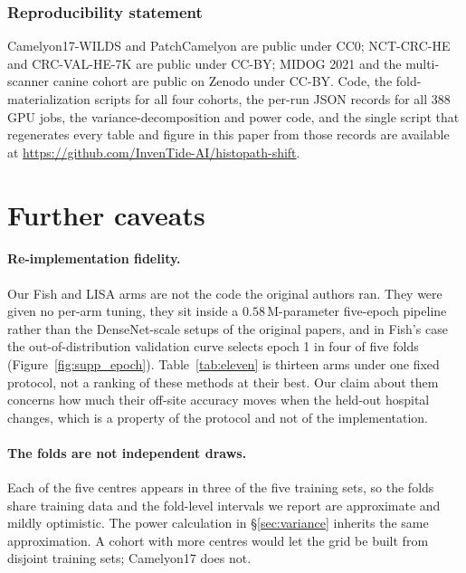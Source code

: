 \documentclass[10pt]{article} %
\begin{document}
\subsubsection*{Reproducibility statement}

Camelyon17-WILDS \citep{koh2021wilds} and PatchCamelyon \citep{veeling2018pcam}
are public under CC0; NCT-CRC-HE and CRC-VAL-HE-7K
\citep{kather2018nct,kather2019predicting} are public under CC-BY; MIDOG 2021
\citep{aubreville2023midog} and the multi-scanner canine cohort
\citep{wilm2023canine} are public on Zenodo under CC-BY. Code, the
fold-materialization scripts for all four cohorts, the per-run JSON records for
all 388 GPU jobs, the variance-decomposition and power code, and the single
script that regenerates every table and figure in this paper from those records
are available at
\url{https://github.com/InvenTide-AI/histopath-shift}.




\appendix
\section{Further caveats}
\label{app:caveats}

\paragraph{Re-implementation fidelity.} Our Fish and LISA arms are not the code
the original authors ran. They were given no per-arm tuning, they sit inside a
$0.58$\,M-parameter five-epoch pipeline rather than the DenseNet-scale setups
of the original papers, and in Fish's case the out-of-distribution validation
curve selects epoch 1 in four of five folds
(Figure~\ref{fig:supp_epoch}). Table~\ref{tab:eleven} is thirteen arms under
one fixed protocol, not a ranking of these methods at their best. Our claim
about them concerns how much their off-site accuracy moves when the held-out
hospital changes, which is a property of the protocol and not of the
implementation.

\paragraph{The folds are not independent draws.} Each of the five centres
appears in three of the five training sets, so the folds share training data
and the fold-level intervals we report are approximate and mildly optimistic.
The power calculation in \S\ref{sec:variance} inherits the same approximation.
A cohort with more centres would let the grid be built from disjoint training
sets; Camelyon17 does not.
\end{document}
